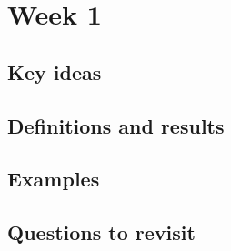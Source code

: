 
\section{Week 1}

\subsection{Key ideas}

\subsection{Definitions and results}
%

\subsection{Examples}

\subsection{Questions to revisit}

